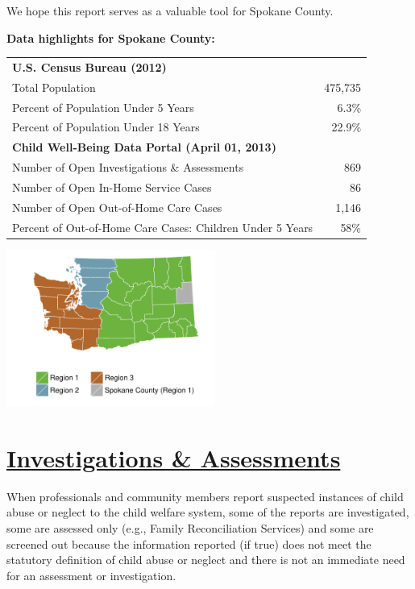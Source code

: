 \documentclass{article}\usepackage[]{graphicx}\usepackage[]{color}
\begin{document}
We hope this report serves as a valuable tool for  Spokane County.

\begin{minipage}{0.6\textwidth}
\textbf{Data highlights for Spokane County:}

\begin{tabular}{lr}
  \toprule
 \textbf{U.S. Census Bureau (2012)} &  \\ 
  \quad Total Population & 475,735 \\ 
  \quad Percent of Population Under 5 Years & 6.3\% \\ 
  \quad Percent of Population Under 18 Years & 22.9\% \\ 
  \textbf{Child Well-Being Data Portal (April 01, 2013)} &  \\ 
  \quad Number of Open Investigations \& Assessments & 869 \\ 
  \quad Number of Open In-Home Service Cases & 86 \\ 
  \quad Number of Open Out-of-Home Care Cases & 1,146 \\ 
  \quad Percent of Out-of-Home Care Cases: Children Under 5 Years & 58\% \\ 
   \bottomrule
\end{tabular}



\end{minipage}
\begin{minipage}{0.4\textwidth}

\begin{center}
\includegraphics[width=2.7in]{county_maps/Spokane-b}
\end{center}

\end{minipage}


\newpage
\restoregeometry
\section{\href{http://www.partnersforourchildren.org//child-well-being/visualizations/investigations-assessments/trends}
{Investigations \& Assessments}}
When professionals and community members report suspected instances of child abuse or neglect to the child welfare system, some of the reports are investigated, some are assessed only (e.g., Family Reconciliation Services) and some are screened out because the information reported (if true) does not meet the statutory definition of child abuse or neglect and there is not an immediate need for an assessment or investigation.\\[6pt]
\label{p:ia}
\end{document}
